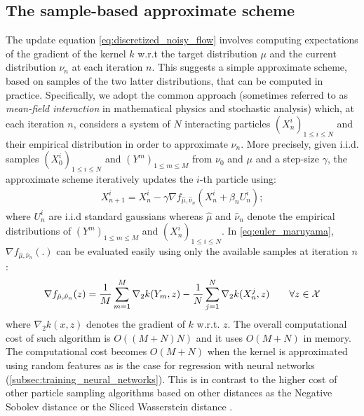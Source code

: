 
\subsection{The sample-based approximate scheme}\label{sec:sample_based}

The update equation \eqref{eq:discretized_noisy_flow} involves computing expectations of the gradient of the kernel $k$ w.r.t the target distribution $\mu$ and the current distribution $\nu_n$ at each iteration $n$. This suggests a simple approximate scheme, based on samples of the two latter distributions, that can be computed in practice. Specifically, we adopt the common approach (sometimes referred to as \textit{mean-field interaction} in mathematical physics and stochastic analysis) which, at each iteration $n$, considers a system of $N$ interacting particles $(X_n^i)_{1\leq i\leq N}$  and their empirical distribution in order to approximate $\nu_n$. 
More precisely, given i.i.d. samples $(X^i_0)_{1\leq i\leq N}$ and $(Y^{m})_{1\leq m\leq M}$ from $\nu_0$ and $\mu$ and a step-size $\gamma$, the approximate scheme iteratively updates the $i$-th particle using: 
\begin{align}\label{eq:euler_maruyama}
X_{n+1}^{i} = X_n^i -\gamma \nabla f_{\hat{\mu},\hat{\nu}_n}(X_n^i+\beta_n U_n^i);
\end{align}
where $U_{n}^{i}$ are i.i.d standard gaussians whereas $\hat{\mu}$ and $\hat{\nu}_n$ denote the empirical distributions of $(Y^{m})_{1\leq m\leq M}$ and $(X^i_n)_{1\leq i\leq N}$. In \cref{eq:euler_maruyama}, $\nabla f_{\hat{\mu},\hat{\nu}_n}(.)$ can be evaluated easily using only the available samples at iteration $n$:
\begin{align}
	 \nabla f_{\hat{\mu},\hat{\nu}_n}(z) = \frac{1}{M}\sum\limits_{m=1}^M \nabla_2 k(Y_m,z)-\frac{1}{N}\sum\limits_{j=1}^N \nabla_2 k(X_n^j,z) \qquad \forall z\in{{\mathcal X}}
\end{align}
where $\nabla_2 k(x,z)$ denotes the gradient of $k$ w.r.t. $z$. The overall computational cost of such algorithm is $O((M+N)N)$ and it uses $O(M+N)$ in memory. The computational cost becomes  $O(M+N)$ when the kernel is approximated using random features as is the case for regression with neural networks (\cref{subsec:training_neural_networks}). This is in contrast to the higher cost of other particle sampling algorithms based on other distances as the Negative Sobolev distance \cite{Mroueh:2019}  or the Sliced Wasserstein distance \cite{csimcsekli2018sliced}.
